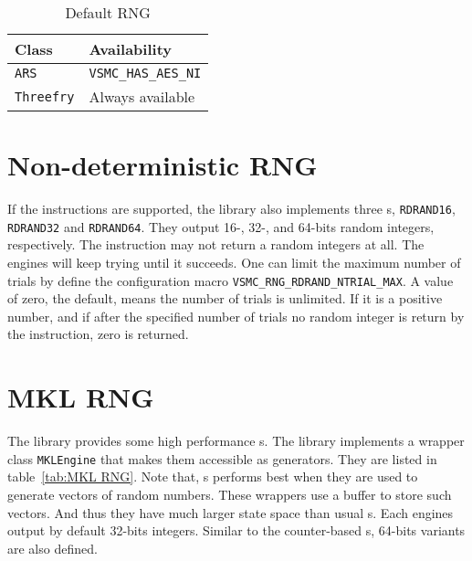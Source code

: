 \begin{table}
  \begin{tabularx}{\textwidth}{XX}
    \toprule
    Class & Availability \\
    \midrule
    \verb|ARS|      & \verb|VSMC_HAS_AES_NI| \\
    \verb|Threefry| & Always available       \\
    \bottomrule
  \end{tabularx}
  \caption{Default RNG}
  \label{tab:Default RNG}
\end{table}

\section{Non-deterministic RNG}
\label{sec:Non-deterministic RNG}

If the \rdrand instructions are supported, the library also implements three
\rng{}s, \verb|RDRAND16|, \verb|RDRAND32| and \verb|RDRAND64|. They output 16-,
32-, and 64-bits random integers, respectively. The \rdrand instruction may not
return a random integers at all. The engines will keep trying until it
succeeds. One can limit the maximum number of trials by define the
configuration macro \verb|VSMC_RNG_RDRAND_NTRIAL_MAX|. A value of zero, the
default, means the number of trials is unlimited. If it is a positive number,
and if after the specified number of trials no random integer is return by the
\rdrand instruction, zero is returned.

\section{MKL RNG}
\label{sec:MKL RNG}

The \mkl library provides some high performance \rng{}s. The library implements
a wrapper class \verb|MKLEngine| that makes them accessible as \cppoo{}
generators. They are listed in table~\ref{tab:MKL RNG}. Note that, \mkl{}
\rng{}s performs best when they are used to generate vectors of random numbers.
These wrappers use a buffer to store such vectors. And thus they have much
larger state space than usual \rng{}s. Each \rng engines output by default
32-bits integers. Similar to the counter-based \rng{}s, 64-bits variants are
also defined.

